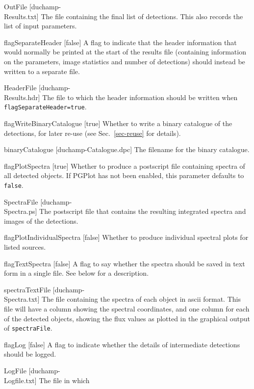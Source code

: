 \begin{Lentry}
\item[{OutFile [duchamp-\\Results.txt]}] The file containing the
  final list of detections. This also records the list of input
  parameters.
\item[{flagSeparateHeader [false]}] A flag to indicate that the header
  information that would normally be printed at the start of the
  results file (containing information on the parameters, image
  statistics and number of detections) should instead be written to a
  separate file.
\item[{HeaderFile [duchamp-\\Results.hdr]}] The file to which the
  header information should be written when
  \texttt{flagSeparateHeader=true}.
\item[{flagWriteBinaryCatalogue [true]}] Whether to write a binary
  catalogue of the detections, for later re-use (see
  Sec.~\ref{sec-reuse} for details).
\item[{binaryCatalogue [duchamp-Catalogue.dpc]}] The filename for the
  binary catalogue.
\item[{flagPlotSpectra [true]}] Whether to produce a postscript file
  containing spectra of all detected objects. If PGPlot has not been
  enabled, this parameter defaults to \texttt{false}.
\item[{SpectraFile [duchamp-\\Spectra.ps]}] The postscript file
  that contains the resulting integrated spectra and images of the
  detections.
\item[{flagPlotIndividualSpectra [false]}] Whether to produce
  individual spectral plots for listed sources.
\item[{flagTextSpectra [false]}] A flag to say whether the spectra
  should be saved in text form in a single file. See below for a
  description. 
\item[{spectraTextFile [duchamp-\\Spectra.txt]}] The file containing
  the spectra of each object in ascii format. This file will have a
  column showing the spectral coordinates, and one column for each of
  the detected objects, showing the flux values as plotted in the
  graphical output of \texttt{spectraFile}.
\item[{flagLog [false]}] A flag to indicate whether the
  details of intermediate detections should be logged.
\item[{LogFile [duchamp-\\Logfile.txt]}] The file in which

\end{Lentry}
